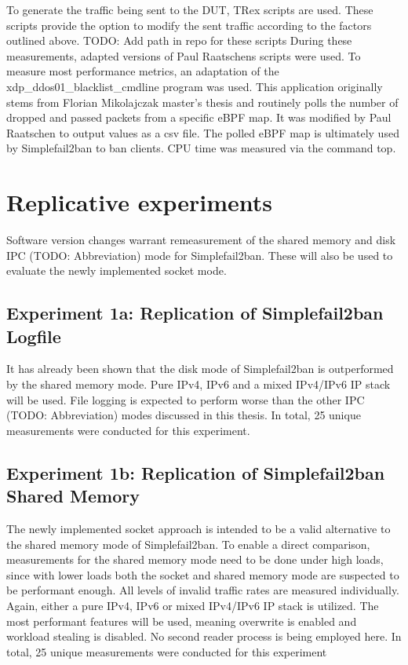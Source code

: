 \bigskip
\noindent
To generate the traffic being sent to the DUT, TRex scripts are used.
These scripts provide the option to modify the sent traffic according to the factors outlined above. TODO: Add path in repo for these scripts
During these measurements, adapted versions of Paul Raatschens\cite{raatschen:ipc} scripts were used.
To measure most performance metrics, an adaptation of the xdp\_ddos01\_blacklist\_cmdline program was used.
This application originally stems from Florian Mikolajczak master's thesis\cite{mikolajczak:ebpf} and routinely polls the number of dropped and passed packets from a specific eBPF map.
It was modified by Paul Raatschen to output values as a csv file.
The polled eBPF map is ultimately used by Simplefail2ban to ban clients.
CPU time was measured via the command top.

\section{Replicative experiments}
Software version changes warrant remeasurement of the shared memory and disk IPC (TODO: Abbreviation) mode for Simplefail2ban.
These will also be used to evaluate the newly implemented socket mode.

\subsection{Experiment 1a: Replication of Simplefail2ban Logfile}
It has already been shown that the disk mode of Simplefail2ban is outperformed by the shared memory mode.
Pure IPv4, IPv6 and a mixed IPv4/IPv6 IP stack will be used.
File logging is expected to perform worse than the other IPC (TODO: Abbreviation) modes discussed in this thesis.
In total, 25 unique measurements were conducted for this experiment.

\subsection{Experiment 1b: Replication of Simplefail2ban Shared Memory}
The newly implemented socket approach is intended to be a valid alternative to the shared memory mode of Simplefail2ban.
To enable a direct comparison, measurements for the shared memory mode need to be done under high loads, since with lower loads both the socket and shared memory mode are suspected to be performant enough.
All levels of invalid traffic rates are measured individually.
Again, either a pure IPv4, IPv6 or mixed IPv4/IPv6 IP stack is utilized.
The most performant features will be used, meaning overwrite is enabled and workload stealing is disabled.
No second reader process is being employed here.
In total, 25 unique measurements were conducted for this experiment

